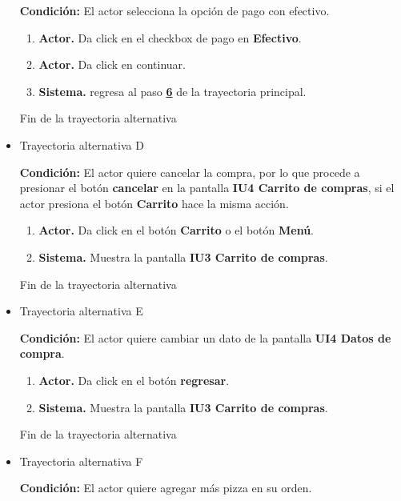 \begin{itemize}
	\noindent \textbf{Condición:} El actor selecciona la opción de pago con efectivo.
	
	\begin{enumerate}
		\item \textbf{Actor.}  Da click en el checkbox de pago en \textbf{Efectivo}.
		\item \textbf{Actor.} Da click en continuar. 
		\item \textbf{Sistema.} regresa al paso \hyperlink{p6}{\textbf{6}} de la trayectoria principal.
	\end{enumerate}
	
	Fin de la trayectoria alternativa
	
	\item \hypertarget{TAD:CU4}{Trayectoria alternativa D}
	
	\noindent \textbf{Condición:} El actor quiere cancelar la compra, por lo que procede a presionar el botón \textbf{cancelar} en la pantalla \textbf{IU4 Carrito de compras}, si el actor presiona el botón \textbf{Carrito} hace la misma acción.
	
	\begin{enumerate}
		\item \textbf{Actor.} Da click en el botón \textbf{Carrito} o el botón \textbf{Menú}.
		\item \textbf{Sistema.} Muestra la pantalla \textbf{IU3 Carrito de compras}.
	\end{enumerate}
	
	Fin de la trayectoria alternativa
	
	\item \hypertarget{TAE:CU4}{Trayectoria alternativa E}
	
	\noindent \textbf{Condición:} El actor quiere cambiar un dato de la pantalla \textbf{UI4 Datos de compra}.
	
	\begin{enumerate}
		\item \textbf{Actor.} Da click en el botón \textbf{regresar}.
		\item \textbf{Sistema.} Muestra la pantalla \textbf{IU3 Carrito de compras}.
	\end{enumerate}
	
	Fin de la trayectoria alternativa
	
	\item \hypertarget{TAF:CU4}{Trayectoria alternativa F}
	
	\noindent \textbf{Condición:} El actor quiere agregar más pizza en su orden.
	

\end{itemize}
